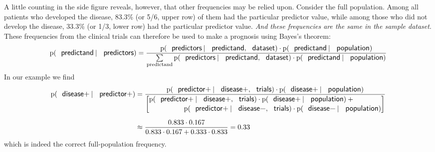 \documentclass[utf8]{FrontiersinHarvard} %
\newcommand*{\p}{\mathrm{p}}%
\renewcommand*{\|}[1][]{\nonscript\:#1\vert\nonscript\:\mathopen{}}
\begin{document}
A little counting in the side figure reveals, however, that other frequencies may be relied upon. Consider the full population. Among all patients who developed the disease, 83.3\% (or 5/6, upper row) of them had the particular predictor value, while among those who did not develop the disease, 33.3\% (or 1/3, lower row) had the particular predictor value. \emph{And these frequencies are the same in the sample dataset}. These frequencies from the clinical trials can therefore be used to make a prognosis using Bayes's theorem:
\begin{equation}
  \label{eq:base-rate_correction}
  \p(\textsf{\small predictand} \| \textsf{\small predictors}) =
  \frac{
    \p(\textsf{\small predictors} \| \textsf{\small predictand},
  \textsf{\small dataset})
  \cdot   \p(\textsf{\small predictand} \| \textsf{\small population})
}{\sum\limits_{\text{predictand}}
    \p(\textsf{\small predictors} \| \textsf{\small predictand},
  \textsf{\small dataset})
  \cdot   \p(\textsf{\small predictand} \| \textsf{\small population})
}
\end{equation}
In our example we find
\begin{equation}
  \label{eq:base-rate_correction_example}
 \begin{split}
   \p(\textsf{\small disease+} \| \textsf{\small predictor+})
   &=
  \frac{
    \p(\textsf{\small predictor+} \| \textsf{\small disease+},
  \textsf{\small trials})
  \cdot   \p(\textsf{\small disease+} \| \textsf{\small population})
}{
  \biggl[\begin{aligned}
    &\p(\textsf{\small predictor+} \| \textsf{\small disease+},
  \textsf{\small trials}) 
  \cdot   \p(\textsf{\small disease+} \| \textsf{\small population})
  +{}\\[-0.5\jot]&\hspace{5em}
    \p(\textsf{\small predictor+} \| \textsf{\small disease\textminus},
  \textsf{\small trials})
  \cdot   \p(\textsf{\small disease\textminus} \| \textsf{\small population})
\end{aligned}\biggr]
} \\[2\jot]
&\approx
  \frac{ 0.833 \cdot 0.167}{0.833 \cdot 0.167 + 0.333 \cdot 0.833}
  = 0.33
  \end{split}
\end{equation}
which is indeed the correct full-population frequency.
\end{document}
